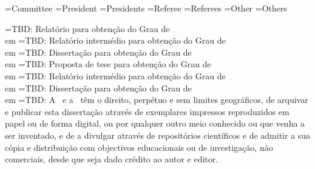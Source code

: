\UNL@jurytitlestr[pen]={Committee}
\UNL@presidentstr[1,en]={President}
\UNL@presidentstr[2,en]={Presidents}
\UNL@refereestr[1,en]={Referee}
\UNL@refereestr[2,en]={Referees}
\UNL@memberstr[1,en]={Other}
\UNL@memberstr[2,en]={Others}
	
\UNL@dissertationstr[bsc,en]={TBD: Relatório para obtenção do Grau de \\\UNL@degree em \@majorfield}
\UNL@dissertationstr[prepmsc,en]={TBD: Relatório intermédio para obtenção do Grau de \\\UNL@degree em \@majorfield}
\UNL@dissertationstr[msc,en]={TBD: Dissertação para obtenção do Grau de \\\UNL@degree em \@majorfield}
\UNL@dissertationstr[propphd,en]={TBD: Proposta de tese para obtenção do Grau de \\\UNL@degree em \@majorfield}
\UNL@dissertationstr[prepphd,en]={TBD: Relatório intermédio para obtenção do Grau de \\\UNL@degree em \@majorfield}
\UNL@dissertationstr[phd,en]={TBD: Dissertação para obtenção do Grau de \\\UNL@degree em \@majorfield}
\UNL@copyrighttext[en]={TBD: A \@faculty\ e a \@university\ têm o direito, perpétuo e sem limites geográficos, de arquivar e publicar esta dissertação através de exemplares impressos reproduzidos em papel ou de forma digital, ou por qualquer outro meio conhecido ou que venha a ser inventado, e de a divulgar através de repositórios científicos e de admitir a sua cópia e distribuição com objectivos educacionais ou de investigação, não comerciais, desde que seja dado crédito ao autor e editor.}
